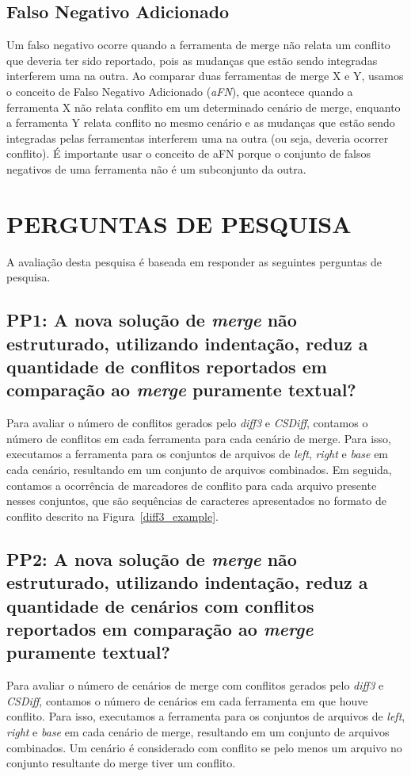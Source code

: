 \subsection{Falso Negativo Adicionado}
Um falso negativo ocorre quando a ferramenta de merge não relata um conflito
que deveria ter sido reportado, pois as mudanças que estão sendo integradas
interferem uma na outra. Ao comparar duas ferramentas de merge X e Y,
usamos o conceito de Falso Negativo Adicionado (\emph{aFN}), que acontece quando a ferramenta X
não relata conflito em um determinado cenário de merge, enquanto a ferramenta Y
relata conflito no mesmo cenário e as mudanças que estão sendo integradas pelas
ferramentas interferem uma na outra (ou seja, deveria ocorrer conflito).
É importante usar o conceito de aFN porque o conjunto de falsos negativos de uma
ferramenta não é um subconjunto da outra.

\section{PERGUNTAS DE PESQUISA}
A avaliação desta pesquisa é baseada em responder as seguintes perguntas de pesquisa.
\subsection{PP1: A nova solução de \emph{merge} não estruturado, utilizando indentação,
	reduz a quantidade de conflitos reportados em comparação ao \emph{merge} puramente textual?}
Para avaliar o número de conflitos gerados pelo \emph{diff3} e \emph{CSDiff}, contamos
o número de conflitos em cada ferramenta para cada cenário de merge. Para isso,
executamos a ferramenta para os conjuntos de arquivos de \emph{left}, \emph{right} e \emph{base} em cada cenário,
resultando em um conjunto de arquivos combinados. Em seguida, contamos a ocorrência
de marcadores de conflito para cada arquivo presente nesses conjuntos, que são sequências
de caracteres apresentados no formato de conflito descrito na Figura~\ref{diff3_example}.
\subsection{PP2: A nova solução de \emph{merge} não estruturado, utilizando indentação,
	reduz a quantidade de cenários com conflitos reportados em comparação ao \emph{merge} puramente textual?}
Para avaliar o número de cenários de merge com conflitos gerados pelo \emph{diff3}
e \emph{CSDiff}, contamos o número de cenários em cada ferramenta em que houve conflito.
Para isso, executamos a ferramenta para os conjuntos de arquivos de \emph{left}, \emph{right} e
\emph{base} em cada cenário de merge, resultando em um conjunto de arquivos combinados. Um
cenário é considerado com conflito se pelo menos um arquivo no conjunto resultante do merge tiver
um conflito.
